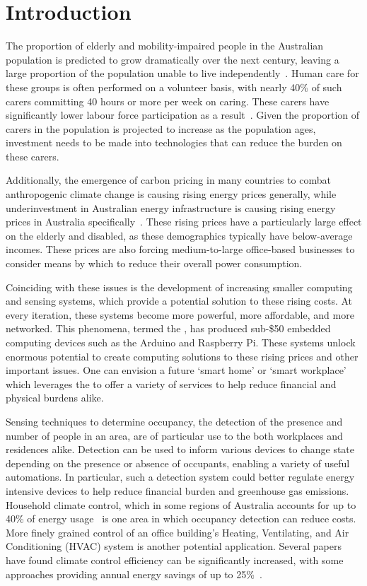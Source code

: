 \documentclass[../thesis/thesis.tex]{subfiles}
\begin{document}
\chapter{Introduction}
The proportion of elderly and mobility-impaired people in the Australian population is predicted to grow dramatically over the next century, leaving a large proportion of the population unable to live independently~\cite{chan2009smart}. Human care for these groups is often performed on a volunteer basis, with nearly 40\% of such carers committing 40 hours or more per week on caring. These carers have significantly lower labour force participation as a result~\cite{abs4430}. Given the proportion of carers in the population is projected to increase as the population ages, investment needs to be made into technologies that can reduce the burden on these carers.

Additionally, the emergence of carbon pricing in many countries to combat anthropogenic climate change is causing rising energy prices generally, while underinvestment in Australian energy infrastructure is causing rising energy prices in Australia specifically~\cite{energyprices}. These rising prices have a particularly large effect on the elderly and disabled, as these demographics typically have below-average incomes. These prices are also forcing medium-to-large office-based businesses to consider means by which to reduce their overall power consumption.

Coinciding with these issues is the development of increasing smaller computing and sensing systems, which provide a potential solution to these rising costs. At every iteration, these systems become more powerful, more affordable, and more networked. This phenomena, termed the \iot, has produced sub-\$50 embedded computing devices such as the Arduino and Raspberry Pi. These systems unlock enormous potential to create computing solutions to these rising prices and other important issues. One can envision a future `smart home' or `smart workplace' which leverages the \iot to offer a variety of services to help reduce financial and physical burdens alike.

Sensing techniques to determine occupancy, the detection of the presence and number of people in an area, are of particular use to the both workplaces and residences alike. Detection can be used to inform various devices to change state depending on the presence or absence of occupants, enabling a variety of useful automations. In particular, such a detection system could better regulate energy intensive devices to help reduce financial burden and greenhouse gas emissions. Household climate control, which in some regions of Australia accounts for up to 40\% of energy usage~\cite{abs4602} is one area in which occupancy detection can reduce costs. More finely grained control of an office building's Heating, Ventilating, and Air Conditioning (HVAC) system is another potential application. Several papers have found climate control efficiency can be significantly increased, with some approaches providing annual energy savings of up to 25\%~\cite{beltran2013thermosense}.
 
\end{document}
